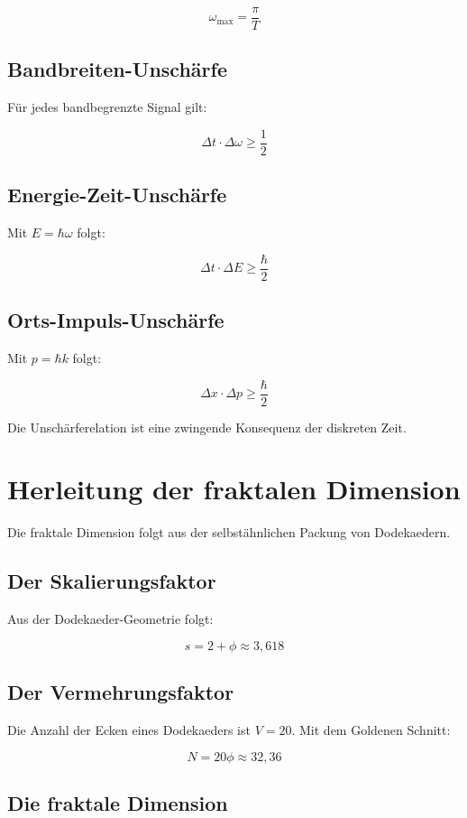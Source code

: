 \[
\omega_{\text{max}} = \frac{\pi}{T}
\]

\subsection{Bandbreiten-Unschärfe}

Für jedes bandbegrenzte Signal gilt:

\[
\Delta t \cdot \Delta \omega \geq \frac{1}{2}
\]

\subsection{Energie-Zeit-Unschärfe}

Mit \( E = \hbar \omega \) folgt:

\[
\Delta t \cdot \Delta E \geq \frac{\hbar}{2}
\]

\subsection{Orts-Impuls-Unschärfe}

Mit \( p = \hbar k \) folgt:

\[
\Delta x \cdot \Delta p \geq \frac{\hbar}{2}
\]

Die Unschärferelation ist eine zwingende Konsequenz der diskreten Zeit.

\section{Herleitung der fraktalen Dimension}

Die fraktale Dimension folgt aus der selbstähnlichen Packung von Dodekaedern.

\subsection{Der Skalierungsfaktor}

Aus der Dodekaeder-Geometrie folgt:

\[
s = 2 + \phi \approx 3,618
\]

\subsection{Der Vermehrungsfaktor}

Die Anzahl der Ecken eines Dodekaeders ist \( V = 20 \). Mit dem Goldenen Schnitt:

\[
N = 20\phi \approx 32,36
\]

\subsection{Die fraktale Dimension}

